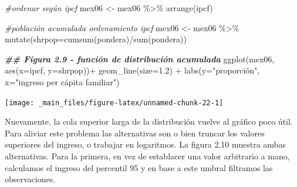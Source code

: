 \documentclass[
]{book}
\newenvironment{Shaded}{\begin{snugshade}}{\end{snugshade}}
\newcommand{\AttributeTok}[1]{\textcolor[rgb]{0.77,0.63,0.00}{#1}}
\newcommand{\CommentTok}[1]{\textcolor[rgb]{0.56,0.35,0.01}{\textit{#1}}}
\newcommand{\DocumentationTok}[1]{\textcolor[rgb]{0.56,0.35,0.01}{\textbf{\textit{#1}}}}
\newcommand{\FloatTok}[1]{\textcolor[rgb]{0.00,0.00,0.81}{#1}}
\newcommand{\FunctionTok}[1]{\textcolor[rgb]{0.00,0.00,0.00}{#1}}
\newcommand{\NormalTok}[1]{#1}
\newcommand{\OtherTok}[1]{\textcolor[rgb]{0.56,0.35,0.01}{#1}}
\newcommand{\SpecialCharTok}[1]{\textcolor[rgb]{0.00,0.00,0.00}{#1}}
\newcommand{\StringTok}[1]{\textcolor[rgb]{0.31,0.60,0.02}{#1}}
\begin{document}
\begin{Shaded}
\begin{Highlighting}[]
\CommentTok{\#ordenar según ipcf}
\NormalTok{mex06 }\OtherTok{\textless{}{-}}\NormalTok{ mex06 }\SpecialCharTok{\%\textgreater{}\%} \FunctionTok{arrange}\NormalTok{(ipcf)}

\CommentTok{\#población acumulada ordenamiento ipcf}
\NormalTok{mex06 }\OtherTok{\textless{}{-}}\NormalTok{ mex06 }\SpecialCharTok{\%\textgreater{}\%} \FunctionTok{mutate}\NormalTok{(}\AttributeTok{shrpop=}\FunctionTok{cumsum}\NormalTok{(pondera)}\SpecialCharTok{/}\FunctionTok{sum}\NormalTok{(pondera))}

\DocumentationTok{\#\# Figura 2.9 {-} función de distribución acumulada}
\FunctionTok{ggplot}\NormalTok{(mex06, }\FunctionTok{aes}\NormalTok{(}\AttributeTok{x=}\NormalTok{ipcf, }\AttributeTok{y=}\NormalTok{shrpop))}\SpecialCharTok{+}
  \FunctionTok{geom\_line}\NormalTok{(}\AttributeTok{size=}\FloatTok{1.2}\NormalTok{) }\SpecialCharTok{+}
  \FunctionTok{labs}\NormalTok{(}\AttributeTok{y=}\StringTok{"proporción"}\NormalTok{, }\AttributeTok{x=}\StringTok{"ingreso per cápita familiar"}\NormalTok{)}
\end{Highlighting}
\end{Shaded}

\texttt{[image: \_main\_files/figure-latex/unnamed-chunk-22-1]}

Nuevamente, la cola superior larga de la distribución vuelve al gráfico poco útil. Para
aliviar este problema las alternativas son o bien truncar los valores superiores del ingreso, o
trabajar en logaritmos. La figura 2.10 muestra ambas alternativas. Para la primera, en vez de establacer una valor arbitrario a mano, calculamos el ingreso del percentil 95 y en base a este umbral filtramos las observaciones.
\end{document}
